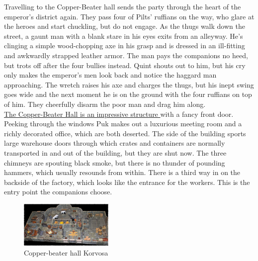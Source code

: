 Travelling to the Copper-Beater hall sends the party through the heart of the emperor's district again. They pass four of Pilts' ruffians on the way, who glare at the heroes and start chuckling, but do not engage. As the thugs walk down the street, a gaunt man with a blank stare in his eyes exits from an alleyway. He's clinging a simple wood-chopping axe in his grasp and is dressed in an ill-fitting and awkwardly strapped leather armor. The man pays the companions no heed, but trots off after the four bullies instead. Quint shouts out to him, but his cry only makes the emperor's men look back and notice the haggard man approaching. The wretch raises his axe and charges the thugs, but his inept swing goes wide and the next moment he is on the ground with the four ruffians on top of him. They cheerfully disarm the poor man and drag him along.\\

\hyperref[fig:Copper-beater-hall-Korvosa-555420262]{ The Copper-Beater Hall is an impressive structure } with a fancy front door. Peeking through the windows Puk makes out a luxurious meeting room and a richly decorated office, which are both deserted. The side of the building sports large warehouse doors through which crates and containers are normally transported in and out of the building, but they are shut now. The three chimneys are spouting black smoke, but there is no thunder of pounding hammers, which usually resounds from within. There is a third way in on the backside of the factory, which looks like the entrance for the workers. This is the entry point the companions choose. \\

\begin{figure}[h]
	\centering
	\includegraphics[width=0.4\textwidth]{images/Copper-beater-hall-Korvosa-555420262_mod.jpg}
	\caption{Copper-beater hall Korvosa}
	\label{fig:Copper-beater-hall-Korvosa-555420262}
\end{figure}

